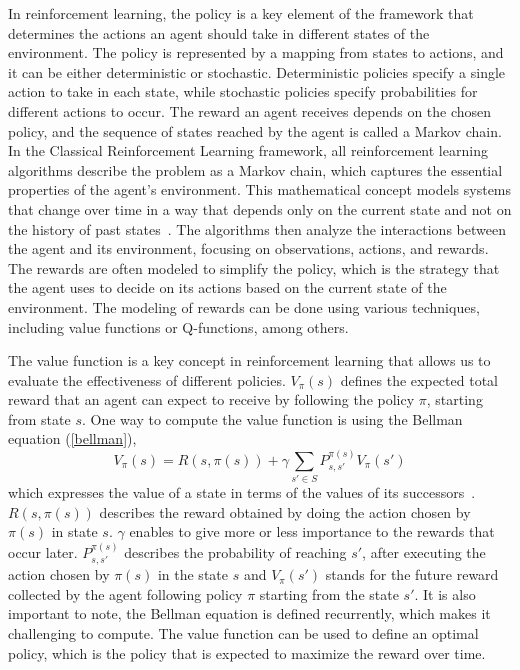 In reinforcement learning, the policy is a key element of the framework that determines the actions an agent should take in different states of the environment. The policy is represented by a mapping from states to actions, and it can be either deterministic or stochastic. Deterministic policies specify a single action to take in each state, while stochastic policies specify probabilities for different actions to occur. The reward an agent receives depends on the chosen policy, and the sequence of states reached by the agent is called a Markov chain. In the Classical Reinforcement Learning framework, all reinforcement learning algorithms describe the problem as a Markov chain, which captures the essential properties of the agent's environment. This mathematical concept models systems that change over time in a way that depends only on the current state and not on the history of past states~\cite{sutton_reinforcement_1998,sutton_reinforcement_2018}. The algorithms then analyze the interactions between the agent and its environment, focusing on observations, actions, and rewards. The rewards are often modeled to simplify the policy, which is the strategy that the agent uses to decide on its actions based on the current state of the environment. The modeling of rewards can be done using various techniques, including value functions or Q-functions, among others.

The value function is a key concept in reinforcement learning that allows us to evaluate the effectiveness of different policies. $V_{\pi}(s)$ defines the expected total reward that an agent can expect to receive by following the policy $\pi$, starting from state $s$. One way to compute the value function is using the Bellman equation (\ref{bellman}),
\begin{equation}\label{bellman}
V_{\pi}(s) = R(s, \pi(s)) + \gamma \sum_{s' \in S} P_{s, s'}^{\pi(s)} V_{\pi}(s')
\end{equation}
which expresses the value of a state in terms of the values of its successors~\cite{barron_bellman_1989}. $R(s, \pi(s))$ describes the reward obtained by doing the action chosen by $\pi(s)$ in state $s$. $\gamma$ enables to give more or less importance to the rewards that occur later. $ P_{s, s'}^{\pi(s)}$ describes the probability of reaching $s'$, after executing the action chosen by $\pi(s)$ in the state $s$ and $V_{\pi}(s')$ stands for the future reward collected by the agent following policy $\pi$ starting from the state $s'$. It is also important to note, the Bellman equation is defined recurrently, which makes it challenging to compute. The value function can be used to define an optimal policy, which is the policy that is expected to maximize the reward over time.

